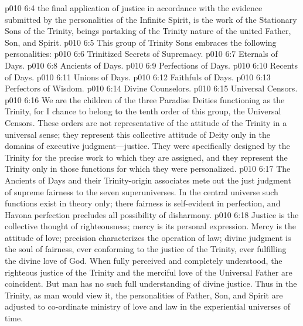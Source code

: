 \pc \vs p010 6:4  the final application of justice in accordance with the evidence submitted by the personalities of the Infinite Spirit, is the work of the Stationary Sons of the Trinity, beings partaking of the Trinity nature of the united Father, Son, and Spirit.
\pc \vs p010 6:5 This group of Trinity Sons embraces the following personalities:
\pc \vs p010 6:6 \bibnobreakspace Trinitized Secrets of Supremacy.
\vs p010 6:7 \bibnobreakspace Eternals of Days.
\vs p010 6:8 \bibnobreakspace Ancients of Days.
\vs p010 6:9 \bibnobreakspace Perfections of Days.
\vs p010 6:10 \bibnobreakspace Recents of Days.
\vs p010 6:11 \bibnobreakspace Unions of Days.
\vs p010 6:12 \bibnobreakspace Faithfuls of Days.
\vs p010 6:13 \bibnobreakspace Perfectors of Wisdom.
\vs p010 6:14 \bibnobreakspace Divine Counselors.
\vs p010 6:15 \bibnobreakspace Universal Censors.
\pc \vs p010 6:16 We are the children of the three Paradise Deities functioning as the Trinity, for I chance to belong to the tenth order of this group, the Universal Censors. These orders are not representative of the attitude of the Trinity in a universal sense; they represent this collective attitude of Deity only in the domains of executive judgment---justice. They were specifically designed by the Trinity for the precise work to which they are assigned, and they represent the Trinity only in those functions for which they were personalized.
\vs p010 6:17 The Ancients of Days and their Trinity\hyp{}origin associates mete out the just judgment of supreme fairness to the seven superuniverses. In the central universe such functions exist in theory only; there fairness is self\hyp{}evident in perfection, and Havona perfection precludes all possibility of disharmony.
\vs p010 6:18 Justice is the collective thought of righteousness; mercy is its personal expression. Mercy is the attitude of love; precision characterizes the operation of law; divine judgment is the soul of fairness, ever conforming to the justice of the Trinity, ever fulfilling the divine love of God. When fully perceived and completely understood, the righteous justice of the Trinity and the merciful love of the Universal Father are coincident. But man has no such full understanding of divine justice. Thus in the Trinity, as man would view it, the personalities of Father, Son, and Spirit are adjusted to co\hyp{}ordinate ministry of love and law in the experiential universes of time.\plusone
